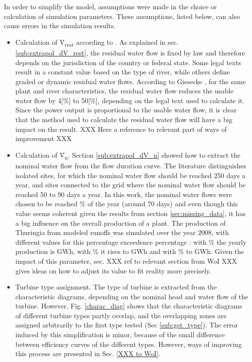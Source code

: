 In order to simplify the model, assumptions were made in the choice or calculation of simulation parameters. These assumptions, listed below, can also cause errors in the simulation results. 
\begin{itemize}
 \item Calculation of \.V\textsubscript{rest} according to \cite{pacer}. As explained in sec. \ref{sub:extrapol_dV_rest}, the residual water flow is fixed by law and therefore depends on the jurisdiction of the country or federal state. Some legal texts result in a constant value based on the type of river, while others define graded or dynamic residual water flows. According to Giesecke \cite{gies_qrest}, for the same plant and river characteristics, the residual water flow reduces the usable water flow by \unit{4}[\%] to \unit{50}[\%], depending on the legal text used to calculate it. Since the power output is proportional to the usable water flow, it is clear that the method used to calculate the residual water flow will have a big impact on the result. XXX Here a reference to relevant part of ways of improvement XXX
 \item Calculation of \.V\textsubscript{n}. Section \ref{sub:extrapol_dV_n} showed how to extract the nominal water flow from the flow duration curve. The literature distinguishes isolated sites, for which the nominal water flow should be reached 250 days a year, and sites connected to the grid where the nominal water flow should be reached 50 to 90 days a year. In this work, the nominal water flows were chosen to be reached \unit[20]{\%} of the year (around 70 days) and even though this value seems coherent given the results from section \ref{sec:missing_data}, it has a big influence on the overall production of a plant. The production of Thuringia from modeled runoffs was simulated over the year 2008, with different values for this percentage exceedence percentage :  with \unit[20]{\%} the yearly production is \unit[187]{GWh}, with \unit[30]{\%} it rises to \unit[210]{GWh} and with \unit[40]{\%} to \unit[223]{GWh}. Given the impact of this parameter, sec. XXX ref to relevant section from WoI XXX gives ideas on how to adjust its value to fit reality more precisely.
 \item Turbine type assignment. The type of turbine is extracted from the characteristic diagrams, depending on the nominal head and water flow of the turbine. However, Fig. \ref{charac_diag} shows that the characteristic diagrams of different turbine types partly overlap, and the overlapping zones are assigned arbitrarily to the first type tested (Sec \ref{sub:get_type}). The error induced by this simplification is minor, because of the small difference between efficiency curves of the different types. However, ways of improving this process are presented in Sec. \ref{XXX to WoI}.

\end{itemize}
